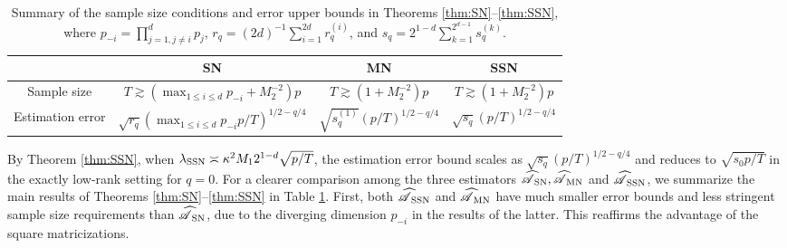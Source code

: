 \documentclass[12pt]{article}
\newcommand{\cm}[1]{\mbox{\boldmath$\mathscr{#1}$}}
\begin{document}
\begin{table}
	\begin{center}
	\begin{tabular}{c|ccc}\hline
		& SN & MN & SSN\\\hline
		Sample size & $T\gtrsim (\max_{1\leq i\leq d}p_{-i}+ M_2^{-2})p$ & $T\gtrsim (1+M_2^{-2})p$ & $T\gtrsim (1+M_2^{-2})p$\\
		Estimation error & $\sqrt{r_q}(\max_{1\leq i\leq d}p_{-i}p/T)^{1/2-q/4}$ & $\sqrt{s_q^{(1)}}(p/T)^{1/2-q/4}$ & $\sqrt{s_q}(p/T)^{1/2-q/4}$ \\\hline
	\end{tabular}
	\caption{Summary of the sample size conditions and error upper bounds in Theorems \ref{thm:SN}--\ref{thm:SSN}, where  $p_{-i}=\prod_{j=1, j\neq i}^{d}p_j$, $r_q=(2d)^{-1}\sum_{i=1}^{2d}r_q^{(i)}$, and $s_q=2^{1-d}\sum_{k=1}^{2^{d-1}}s_q^{(k)}$. 
	\label{table1}} 
	\end{center}
\end{table}


By Theorem \ref{thm:SSN}, when $\lambda_{\textup{SSN}}\asymp\kappa^2M_12^{1-d}\sqrt{p/T}$, the estimation error bound scales as $\sqrt{s_q}(p/T)^{1/2-q/4}$ and reduces to $\sqrt{s_0p/T}$ in the exactly low-rank setting for $q=0$. For a clearer comparison among the three estimators $\cm{\widehat{A}}_{\textup{SN}}, \cm{\widehat{A}}_{\textup{MN}}$ and $\cm{\widehat{A}}_{\textup{SSN}}$, we summarize the  main results of Theorems \ref{thm:SN}--\ref{thm:SSN} in Table \ref{table1}. 
First, both $\cm{\widehat{A}}_{\textup{SSN}}$ and $\cm{\widehat{A}}_{\textup{MN}}$ have much smaller error bounds and less stringent sample size requirements than $\cm{\widehat{A}}_{\textup{SN}}$, due to the diverging dimension $p_{-i}$ in the results of the latter. This reaffirms the advantage of the square matricizations. 
\end{document}
